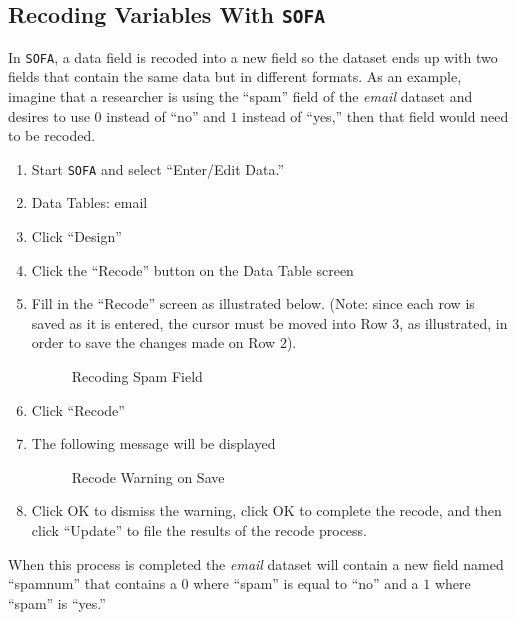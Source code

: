 \subsection{Recoding Variables With \texttt{SOFA}}

In \texttt{SOFA}, a data field is recoded into a new field so the dataset ends up with two fields that contain the same data but in different formats. As an example, imagine that a researcher is using the ``spam'' field of the \textit{email} dataset and desires to use $ 0 $ instead of ``no'' and $ 1 $ instead of ``yes,'' then that field would need to be recoded.

\begin{enumerate}
  \item {Start \texttt{SOFA} and select ``Enter/Edit Data.''}
  \item Data Tables: email
  \item Click ``Design''
  \item Click the ``Recode'' button on the Data Table screen
  \item Fill in the ``Recode'' screen as illustrated below. (Note: since each row is saved as it is entered, the cursor must be moved into Row $ 3 $, as illustrated, in order to save the changes made on Row $ 2 $).
  
  \begin{figure}[H]
    \begin{center}
      \caption{Recoding Spam Field}
    \end{center}
  \end{figure}
  
  \item Click ``Recode''
  \item The following message will be displayed
  
  \begin{figure}[H]
    \begin{center}
      \caption{Recode Warning on Save}
    \end{center}
  \end{figure}
  
  \item Click OK to dismiss the warning, click OK to complete the recode, and then click ``Update'' to file the results of the recode process.

\end{enumerate}

When this process is completed the \textit{email} dataset will contain a new field named ``spamnum'' that contains a $ 0 $ where ``spam'' is equal to ``no'' and a $ 1 $ where ``spam'' is ``yes.''

